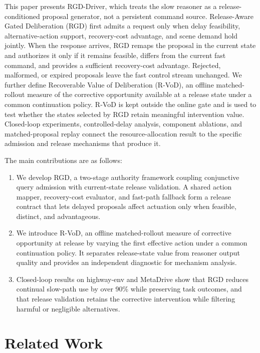 \documentclass[letterpaper,journal]{IEEEtran}
\begin{document}
This paper presents RGD-Driver, which treats the slow reasoner as a
release-conditioned proposal generator, not a persistent command
source. Release-Aware Gated Deliberation (RGD) first admits a request only when
delay feasibility, alternative-action support, recovery-cost advantage, and
scene demand hold jointly. When the response arrives, RGD remaps the proposal
in the current state and authorizes it only if it remains feasible, differs
from the current fast command, and provides a sufficient recovery-cost
advantage. Rejected, malformed, or expired proposals leave the fast control
stream unchanged. We further define Recoverable Value of Deliberation
(R-VoD), an offline matched-rollout measure of the corrective opportunity
available at a release state under a common continuation policy. R-VoD is kept
outside the online gate and is used to test whether the states selected by RGD
retain meaningful intervention value. Closed-loop experiments,
controlled-delay analysis, component ablations, and matched-proposal replay
connect the resource-allocation result to the specific admission and release
mechanisms that produce it.

The main contributions are as follows:

\begin{enumerate}
  \item We develop RGD, a two-stage authority framework coupling conjunctive
  query admission with current-state release validation. A shared action
  mapper, recovery-cost evaluator, and fast-path fallback form a release
  contract that lets delayed proposals affect actuation only when feasible,
  distinct, and advantageous.
  \item We introduce R-VoD, an offline matched-rollout measure of corrective
  opportunity at release by varying the first effective action under a common
  continuation policy. It separates release-state value from reasoner output
  quality and provides an independent diagnostic for mechanism analysis.
  \item Closed-loop results on highway-env and MetaDrive show that RGD
  reduces continual slow-path use by over 90\% while preserving task
  outcomes, and that release validation retains the corrective intervention while
  filtering harmful or negligible alternatives.
\end{enumerate}
\section{Related Work}
\label{sec:related}
\end{document}
